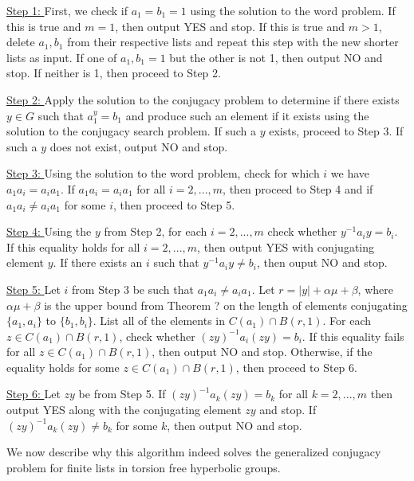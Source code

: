 \documentclass[12pt]{article}
\newcommand{\vs}{\vskip10pt}
\begin{document}
	\underline{Step 1: } First, we check if $a_1 = b_1 = 1$ using the solution to the word problem. If this is true and $m = 1$, then output YES and stop. If this is true and $m > 1$, delete $a_1, b_1$ from their respective lists and repeat this step with the new shorter lists as input. If one of $a_1, b_1 = 1$ but the other is not 1, then output NO and stop. If neither is 1, then proceed to Step 2. 
	
	\vs 
	
	\underline{Step 2: } Apply the solution to the conjugacy problem to determine if there exists $y \in G$ such that $a_1^y = b_1$ and produce such an element if it exists using the solution to the conjugacy search problem. If such a $y$ exists, proceed to Step 3. If such a $y$ does not exist, output NO and stop. 
	
	\vs 
	
	\underline{Step 3: } Using the solution to the word problem, check for which $i$ we have $a_1 a_i = a_i a_1$. If $a_1 a_i = a_i a_1$ for all $i = 2,...,m$, then proceed to Step 4 and if $a_1 a_i \neq a_i a_1$ for some $i$, then proceed to Step 5. 
	
	\vs
	
	\underline{Step 4: } Using the $y$ from Step 2, for each $i = 2,...,m$ check whether $y^{-1} a_i y  = b_i$. If this equality holds for all $i = 2,...,m$, then output YES with conjugating element $y$. If there exists an $i$ such that $y^{-1} a_i y \neq b_i$, then ouput NO and stop. 
	
	\vs
	
	\underline{Step 5: } Let $i$ from Step 3 be such that $a_1 a_i \neq a_i a_1$. Let $r = \vert y \vert + \alpha \mu + \beta$, where $\alpha \mu + \beta$ is the upper bound from Theorem ? on the length of elements conjugating $\{a_1, a_i\}$ to $\{b_1, b_i\}$. List all of the elements in $C(a_1) \cap B(r,1)$. For each $z \in C(a_1) \cap B(r,1)$, check whether $(zy)^{-1} a_i (zy) = b_i$. If this equality fails for all $z \in C(a_1) \cap B(r,1)$, then output NO and stop. Otherwise, if the equality holds for some $z \in C(a_1) \cap B(r,1)$, then proceed to Step 6. 
	
	\vs 
	
	\underline{Step 6: } Let $zy$ be from Step 5. If $(zy)^{-1} a_k (zy) = b_k$ for all $k = 2,...,m$ then output YES along with the conjugating element $zy$ and stop. If $(zy)^{-1} a_k (zy) \neq b_k$ for some $k$, then output NO and stop. 
	
	\vs 
	
	We now describe why this algorithm indeed solves the generalized conjugacy problem for finite lists in torsion free hyperbolic groups.
	
\end{document}
